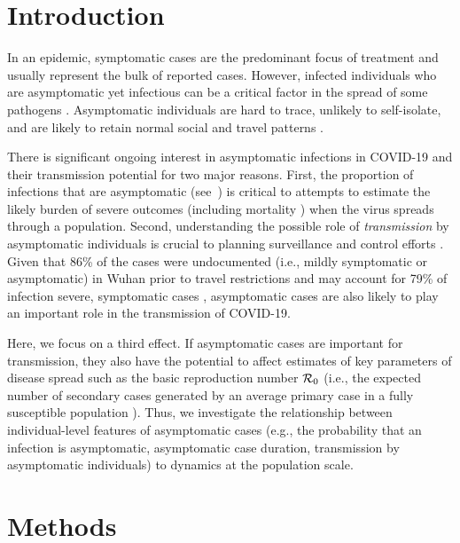 \section{Introduction}

In an epidemic, symptomatic cases are the predominant focus of treatment and usually represent the bulk of reported cases. 
However, infected individuals who are asymptomatic yet infectious can be a critical factor in the spread of some pathogens \citep{fraser2004factors}.
Asymptomatic individuals are hard to trace, unlikely to self-isolate, and are likely to retain normal social and travel patterns \citep{quilty2020effectiveness}.

There is significant ongoing interest in asymptomatic infections in COVID-19 \citep{chan2020familial, pan2020asymptomatic, tangearly} and their transmission potential \citep{bai2020presumed} for two major reasons.
First, the proportion of infections that are asymptomatic (see~\citep{mizumoto_2020}) is critical to attempts to estimate the likely burden of severe outcomes (including mortality \citep{fauci_nejm2020}) when the virus spreads through a population.
Second, understanding the possible role of \emph{transmission} by asymptomatic individuals is crucial to planning surveillance and control efforts \citep{fraser2004factors}.
Given that 86\% of the cases were undocumented (i.e., mildly symptomatic or asymptomatic) in Wuhan prior to travel restrictions and may account for 79\% of infection \DIFdelbegin {}\DIFdelend \DIFaddbegin {}\DIFaddend severe, symptomatic cases \citep{Lieabb3221}, asymptomatic cases are also likely to play an important role in the transmission of COVID-19.

Here, we focus on a third effect. 
If asymptomatic cases are important for transmission, they also have the potential to affect estimates of key parameters of disease spread such as the basic reproduction number ${\cal{R}}_0$ (i.e., the expected number of secondary cases generated by an average primary case in a fully susceptible population \citep{anderson1992infectious}). 
Thus, we investigate the relationship between individual-level features of asymptomatic cases (e.g., the probability that an infection is asymptomatic, asymptomatic case duration, transmission by asymptomatic individuals) to dynamics at the population scale.

\section{Methods}

